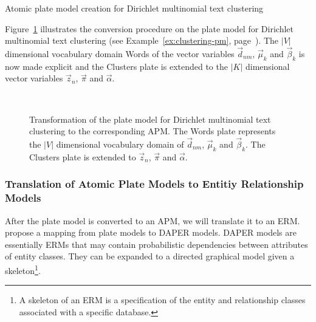 \begin{Example} Atomic plate model creation for Dirichlet multinomial text clustering
\label{ex:clustering-apm}

Figure~\ref{fig:clustering_platemodels} illustrates the conversion procedure on the plate model for Dirichlet multinomial text clustering (see Example~\ref{ex:clustering-pm}, page~\pageref{ex:clustering-pm}). The $|V|$ dimensional vocabulary domain Words of the vector variables $\vec d_{nm}$, $\vec \mu_k$ and $\vec \beta_k$ is now made explicit and the Clusters plate is extended to the $|K|$ dimensional vector variables $\vec z_n$, $\vec \pi$ and $\vec \alpha$.

\begin{figure}[h!]
\begin{minipage}[t]{0.49\linewidth}
	\begin{center}
	\end{center}
\end{minipage}
\hspace{0.0cm}
\begin{minipage}[t]{0.49\linewidth}
	\begin{center}
	\end{center}
\end{minipage}\\
\caption[Dirichlet multinomial text clustering APM]{Transformation of the plate model for Dirichlet multinomial text clustering to the corresponding APM. The Words plate represents the $|V|$ dimensional vocabulary domain of $\vec d_{nm}$, $\vec \mu_k$ and $\vec \beta_k$. The Clusters plate is extended to $\vec z_n$, $\vec \pi$ and $\vec \alpha$.}
\label{fig:clustering_platemodels}
\end{figure}

\end{Example}

\subsubsection{Translation of Atomic Plate Models to Entitiy Relationship Models}

After the plate model is converted to an APM, we will translate it to an ERM. \textcite{heckerman2007probabilistic} propose a mapping from plate models to DAPER models. DAPER models are essentially ERMs that may contain probabilistic dependencies between attributes of entity classes. They can be expanded to a directed graphical model given a skeleton\footnote{A skeleton of an ERM is a specification of the entity and relationship classes associated with a specific database.}.

